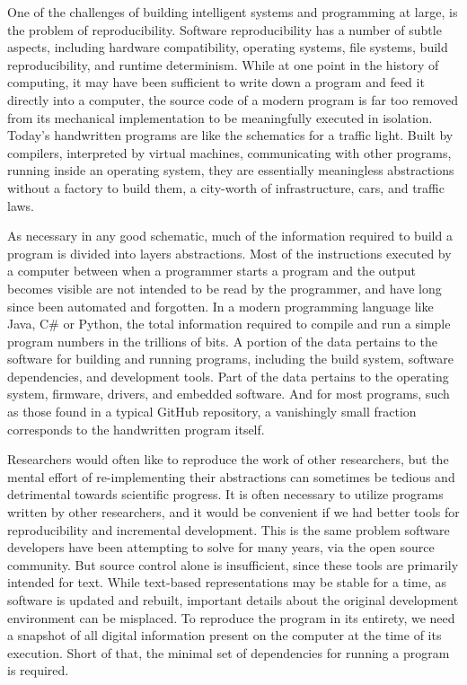 \documentclass[12pt,initial,twoside,maitrise]{dms}
\numberwithin{equation}{section}
\numberwithin{table}{chapter}
\numberwithin{figure}{chapter}
\begin{document}
One of the challenges of building intelligent systems and programming at large, is the problem of reproducibility. Software reproducibility has a number of subtle aspects, including hardware compatibility, operating systems, file systems, build reproducibility, and runtime determinism. While at one point in the history of computing, it may have been sufficient to write down a program and feed it directly into a computer, the source code of a modern program is far too removed from its mechanical implementation to be meaningfully executed in isolation. Today's handwritten programs are like the schematics for a traffic light. Built by compilers, interpreted by virtual machines, communicating with other programs, running inside an operating system, they are essentially meaningless abstractions without a factory to build them, a city-worth of infrastructure, cars, and traffic laws.

As necessary in any good schematic, much of the information required to build a program is divided into layers abstractions. Most of the instructions executed by a computer between when a programmer starts a program and the output becomes visible are not intended to be read by the programmer, and have long since been automated and forgotten. In a modern programming language like Java, C\# or Python, the total information required to compile and run a simple program numbers in the trillions of bits. A portion of the data pertains to the software for building and running programs, including the build system, software dependencies, and development tools. Part of the data pertains to the operating system, firmware, drivers, and embedded software. And for most programs, such as those found in a typical GitHub repository, a vanishingly small fraction corresponds to the handwritten program itself.

Researchers would often like to reproduce the work of other researchers, but the mental effort of re-implementing their abstractions can sometimes be tedious and detrimental towards scientific progress. It is often necessary to utilize programs written by other researchers, and it would be convenient if we had better tools for reproducibility and incremental development. This is the same problem software developers have been attempting to solve for many years, via the open source community. But source control alone is insufficient, since these tools are primarily intended for text. While text-based representations may be stable for a time, as software is updated and rebuilt, important details about the original development environment can be misplaced. To reproduce the program in its entirety, we need a snapshot of all digital information present on the computer at the time of its execution. Short of that, the minimal set of dependencies for running a program is required.
\end{document}
